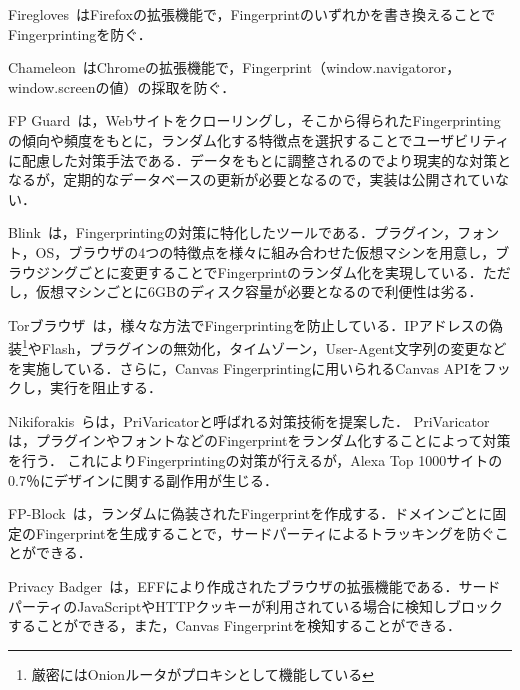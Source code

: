 Firegloves~\cite{firegloves}はFirefoxの拡張機能で，Fingerprintのいずれかを書き換えることでFingerprintingを防ぐ．

Chameleon~\cite{chamereon}はChromeの拡張機能で，Fingerprint（window.navigatoror，window.screenの値）の採取を防ぐ．

FP Guard~\cite{faizkhademi2015fpguard}は，Webサイトをクローリングし，そこから得られたFingerprintingの傾向や頻度をもとに，ランダム化する特徴点を選択することでユーザビリティに配慮した対策手法である．データをもとに調整されるのでより現実的な対策となるが，定期的なデータベースの更新が必要となるので，実装は公開されていない．

Blink~\cite{blink}は，Fingerprintingの対策に特化したツールである．プラグイン，フォント，OS，ブラウザの4つの特徴点を様々に組み合わせた仮想マシンを用意し，ブラウジングごとに変更することでFingerprintのランダム化を実現している．ただし，仮想マシンごとに6GBのディスク容量が必要となるので利便性は劣る．

Torブラウザ~\cite{tor}は，様々な方法でFingerprintingを防止している．IPアドレスの偽装\footnote{厳密にはOnionルータがプロキシとして機能している}やFlash，プラグインの無効化，タイムゾーン，User-Agent文字列の変更などを実施している．さらに，Canvas Fingerprintingに用いられるCanvas APIをフックし，実行を阻止する．

Nikiforakis~\cite{nikiforakis2015privaricator}らは，PriVaricatorと呼ばれる対策技術を提案した．
PriVaricatorは，プラグインやフォントなどのFingerprintをランダム化することによって対策を行う．
これによりFingerprintingの対策が行えるが，Alexa Top 1000サイトの0.7％にデザインに関する副作用が生じる．

FP-Block~\cite{torres2015fp}は，ランダムに偽装されたFingerprintを作成する．ドメインごとに固定のFingerprintを生成することで，サードパーティによるトラッキングを防ぐことができる．

Privacy Badger~\cite{privacybadger}は，EFFにより作成されたブラウザの拡張機能である．サードパーティのJavaScriptやHTTPクッキーが利用されている場合に検知しブロックすることができる，また，Canvas Fingerprintを検知することができる．
